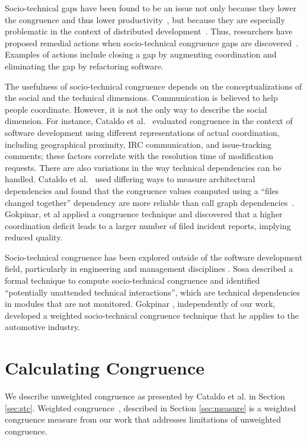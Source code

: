Socio-technical gaps have been found to be an issue not only because they lower
the congruence and thus lower productivity~\cite{cataldo:cscw:2006}, but because they are especially problematic in the context of distributed development~\cite{ehrlich2008:gaps}. Thus, researchers have proposed remedial actions when socio-technical congruence gaps are discovered~\cite{valetto2007:value}. 
Examples of actions include closing a gap by augmenting coordination and eliminating the gap by refactoring software.

The usefulness of socio-technical congruence depends on the conceptualizations of
the social and the technical dimensions. Communication is believed to help people coordinate. However, it is not the only way to describe the social dimension. 
For instance, Cataldo et al.~\cite{cataldo:cscw:2006} evaluated congruence in the context of software development using different representations of actual coordination, including geographical proximity, IRC communication, and issue-tracking comments; these factors correlate with the resolution time of modification requests. There are also variations in the way technical dependencies can be handled. Cataldo et al.~\cite{cataldo:esem:2008} used differing ways to measure architectural dependencies and found that the congruence values computed using a ``files changed together'' dependency are more reliable than call graph dependencies~\cite{deSouza2004:thwarts_collaboration}. Gokpinar, et al \cite{gokpinar2010} applied a congruence technique and discovered that a higher coordination deficit leads to a larger number of filed incident reports, implying reduced quality.

Socio-technical congruence has been explored outside of the software development field, particularly in engineering and management disciplines \cite{henderson1990,sosa2004:manage,gokpinar2010,sosa2008}. Sosa \cite{sosa2008} described a formal technique to compute socio-technical congruence and identified ``potentially unattended technical interactions'', which are technical dependencies in modules that are not monitored. Gokpinar \cite{gokpinar2010}, independently of our work, developed a weighted socio-technical congruence technique that he applies to the automotive industry.


\section{Calculating Congruence}
\label{sec:congruence}
We describe unweighted congruence as presented by Cataldo et al. \cite{cataldo:cscw:2006} in Section \ref{sec:stc}. Weighted congruence~\cite{kwan2009:weighted}, described in Section \ref{sec:measure} is a weighted congruence measure from our work that addresses limitations of unweighted congruence.

